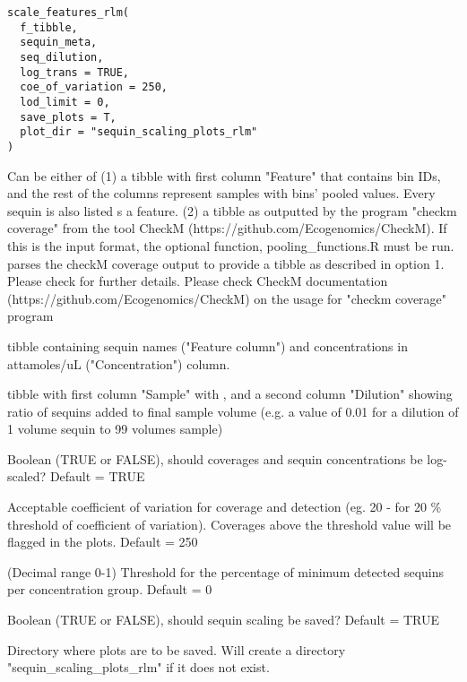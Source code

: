 \documentclass[a4paper]{book}
\begin{document}
%
\begin{Usage}
\begin{verbatim}
scale_features_rlm(
  f_tibble,
  sequin_meta,
  seq_dilution,
  log_trans = TRUE,
  coe_of_variation = 250,
  lod_limit = 0,
  save_plots = T,
  plot_dir = "sequin_scaling_plots_rlm"
)
\end{verbatim}
\end{Usage}
%
\begin{Arguments}
\begin{ldescription}
\item[\code{f\_tibble}] Can be either of
(1) a tibble with first column "Feature" that contains bin IDs, and the rest of the columns represent samples with bins' pooled values. Every sequin is also listed s a feature.
(2) a tibble as outputted by the program "checkm coverage" from the tool CheckM (https://github.com/Ecogenomics/CheckM). If this is the input format, the optional function, pooling\_functions.R must be run.  parses the checkM coverage output to provide a tibble as described in option 1. Please check  for further details. Please check CheckM documentation (https://github.com/Ecogenomics/CheckM) on the usage for "checkm coverage" program

\item[\code{sequin\_meta}] tibble containing sequin names ("Feature column") and concentrations in attamoles/uL ("Concentration") column.

\item[\code{seq\_dilution}] tibble with first column "Sample" with , and a second column "Dilution" showing ratio of sequins added to final sample volume (e.g. a value of 0.01 for a dilution of 1 volume sequin to 99 volumes sample)

\item[\code{log\_trans}] Boolean (TRUE or FALSE), should coverages and sequin concentrations be log-scaled? Default = TRUE

\item[\code{coe\_of\_variation}] Acceptable coefficient of variation for coverage and detection (eg. 20 - for 20 \% threshold of coefficient of variation). Coverages above the threshold value will be flagged in the plots. Default = 250

\item[\code{lod\_limit}] (Decimal range 0-1) Threshold for the percentage of minimum detected sequins per concentration group. Default = 0

\item[\code{save\_plots}] Boolean (TRUE or FALSE), should sequin scaling be saved? Default = TRUE

\item[\code{plot\_dir}] Directory where plots are to be saved. Will create a directory "sequin\_scaling\_plots\_rlm" if it does not exist.
\end{ldescription}
\end{Arguments}
\end{document}
